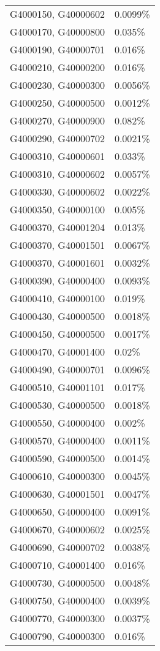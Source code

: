\begin{longtable}[]{@{}ll@{}}
G4000150, G40000602 & 0.0099\% \\
G4000170, G40000800 & 0.035\% \\
G4000190, G40000701 & 0.016\% \\
G4000210, G40000200 & 0.016\% \\
G4000230, G40000300 & 0.0056\% \\
G4000250, G40000500 & 0.0012\% \\
G4000270, G40000900 & 0.082\% \\
G4000290, G40000702 & 0.0021\% \\
G4000310, G40000601 & 0.033\% \\
G4000310, G40000602 & 0.0057\% \\
G4000330, G40000602 & 0.0022\% \\
G4000350, G40000100 & 0.005\% \\
G4000370, G40001204 & 0.013\% \\
G4000370, G40001501 & 0.0067\% \\
G4000370, G40001601 & 0.0032\% \\
G4000390, G40000400 & 0.0093\% \\
G4000410, G40000100 & 0.019\% \\
G4000430, G40000500 & 0.0018\% \\
G4000450, G40000500 & 0.0017\% \\
G4000470, G40001400 & 0.02\% \\
G4000490, G40000701 & 0.0096\% \\
G4000510, G40001101 & 0.017\% \\
G4000530, G40000500 & 0.0018\% \\
G4000550, G40000400 & 0.002\% \\
G4000570, G40000400 & 0.0011\% \\
G4000590, G40000500 & 0.0014\% \\
G4000610, G40000300 & 0.0045\% \\
G4000630, G40001501 & 0.0047\% \\
G4000650, G40000400 & 0.0091\% \\
G4000670, G40000602 & 0.0025\% \\
G4000690, G40000702 & 0.0038\% \\
G4000710, G40001400 & 0.016\% \\
G4000730, G40000500 & 0.0048\% \\
G4000750, G40000400 & 0.0039\% \\
G4000770, G40000300 & 0.0037\% \\
G4000790, G40000300 & 0.016\% \\

\end{longtable}
